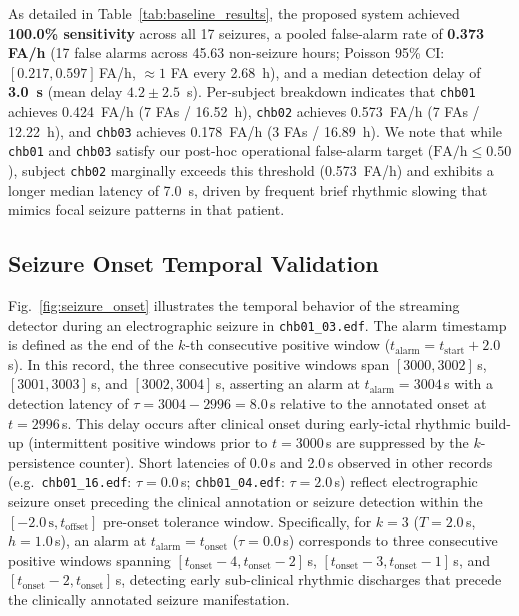 \documentclass[10pt,twocolumn,letterpaper]{article}
\begin{document}
{As detailed in Table~\ref{tab:baseline_results}, the proposed system achieved \textbf{100.0\% sensitivity} across all 17 seizures, a pooled false-alarm rate of \textbf{0.373 FA/h} (17 false alarms across 45.63 non-seizure hours; Poisson 95\% CI: $[0.217, 0.597]$\,FA/h, $\approx 1$ FA every 2.68~h), and a median detection delay of \textbf{3.0~s} (mean delay $4.2 \pm 2.5$~s).
Per-subject breakdown indicates that \texttt{chb01} achieves 0.424~FA/h (7 FAs / 16.52~h), \texttt{chb02} achieves 0.573~FA/h (7 FAs / 12.22~h), and \texttt{chb03} achieves 0.178~FA/h (3 FAs / 16.89~h). We note that while \texttt{chb01} and \texttt{chb03} satisfy our post-hoc operational false-alarm target ($\mathrm{FA/h} \le 0.50$), subject \texttt{chb02} marginally exceeds this threshold (0.573~FA/h) and exhibits a longer median latency of 7.0~s, driven by frequent brief rhythmic slowing that mimics focal seizure patterns in that patient.

\subsection{Seizure Onset Temporal Validation}
Fig.~\ref{fig:seizure_onset} illustrates the temporal behavior of the streaming detector during an electrographic seizure in \texttt{chb01\_03.edf}. The alarm timestamp is defined as the end of the $k$-th consecutive positive window ($t_{\text{alarm}} = t_{\text{start}} + 2.0$\,s). In this record, the three consecutive positive windows span $[3000, 3002]$\,s, $[3001, 3003]$\,s, and $[3002, 3004]$\,s, asserting an alarm at $t_{\text{alarm}} = 3004$\,s with a detection latency of $\tau = 3004 - 2996 = 8.0$\,s relative to the annotated onset at $t=2996$\,s. This delay occurs after clinical onset during early-ictal rhythmic build-up (intermittent positive windows prior to $t=3000$\,s are suppressed by the $k$-persistence counter). Short latencies of 0.0\,s and 2.0\,s observed in other records (e.g.\ \texttt{chb01\_16.edf}: $\tau=0.0$\,s; \texttt{chb01\_04.edf}: $\tau=2.0$\,s) reflect electrographic seizure onset preceding the clinical annotation or seizure detection within the $[-2.0\,\text{s}, t_{\text{offset}}]$ pre-onset tolerance window. Specifically, for $k=3$ ($T=2.0$\,s, $h=1.0$\,s), an alarm at $t_{\text{alarm}} = t_{\text{onset}}$ ($\tau = 0.0$\,s) corresponds to three consecutive positive windows spanning $[t_{\text{onset}}-4, t_{\text{onset}}-2]$\,s, $[t_{\text{onset}}-3, t_{\text{onset}}-1]$\,s, and $[t_{\text{onset}}-2, t_{\text{onset}}]$\,s, detecting early sub-clinical rhythmic discharges that precede the clinically annotated seizure manifestation.

}
\end{document}

